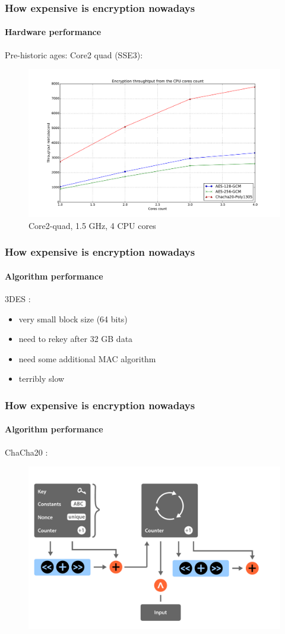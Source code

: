 \documentclass[12pt,t]{beamer}
\newcommand{\cipher}[1]{
	{\color{blue!30} #1}
}
\begin{document}
\begin{frame}
\frametitle{How expensive is encryption nowadays}
\framesubtitle{Hardware performance}
Pre-historic ages: Core2 quad (SSE3):
\begin{figure}[H]
\includegraphics[height=0.6\textheight]{perf-c2.pdf}
\caption{Core2-quad, 1.5 GHz, 4 CPU cores}
\end{figure}
\end{frame}

\begin{frame}
\frametitle{How expensive is encryption nowadays}
\framesubtitle{Algorithm performance} 
\cipher{3DES}:
	\begin{itemize}
	\item very small block size (64 bits)
	\item need to rekey after 32 GB data
	\item need some additional MAC algorithm
	\item terribly slow
	\end{itemize}
\end{frame}

\begin{frame}
\frametitle{How expensive is encryption nowadays}
\framesubtitle{Algorithm performance} 
\cipher{ChaCha20}:
\begin{figure}[H]
\includegraphics[height=0.7\textheight]{chacha.pdf}
\end{figure}
\end{frame}
\end{document}
